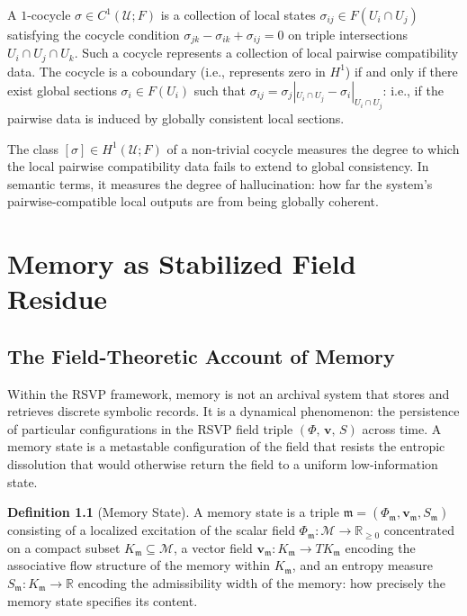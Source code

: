 \documentclass[12pt, a4paper, openany]{book}
\theoremstyle{plain}
\theoremstyle{definition}
\newtheorem{definition}[theorem]{Definition}
\theoremstyle{remark}
\newcommand{\vvec}{\mathbf{v}}
\newcommand{\Sfield}{S}
\newcommand{\RSVPtriple}{(\Phi,\,\vvec,\,\Sfield)}
\begin{document}
A $1$-cocycle $\sigma \in C^1(\mathcal{U}; F)$ is a collection of local states $\sigma_{ij} \in F(U_i \cap U_j)$ satisfying the cocycle condition $\sigma_{jk} - \sigma_{ik} + \sigma_{ij} = 0$ on triple intersections $U_i \cap U_j \cap U_k$. Such a cocycle represents a collection of local pairwise compatibility data. The cocycle is a coboundary (i.e., represents zero in $H^1$) if and only if there exist global sections $\sigma_i \in F(U_i)$ such that $\sigma_{ij} = \sigma_j|_{U_i \cap U_j} - \sigma_i|_{U_i \cap U_j}$: i.e., if the pairwise data is induced by globally consistent local sections.

The class $[\sigma] \in H^1(\mathcal{U}; F)$ of a non-trivial cocycle measures the degree to which the local pairwise compatibility data fails to extend to global consistency. In semantic terms, it measures the degree of hallucination: how far the system's pairwise-compatible local outputs are from being globally coherent.

\chapter{Memory as Stabilized Field Residue}

\section{The Field-Theoretic Account of Memory}

Within the RSVP framework, memory is not an archival system that stores and retrieves discrete symbolic records. It is a dynamical phenomenon: the persistence of particular configurations in the RSVP field triple $\RSVPtriple$ across time. A memory state is a metastable configuration of the field that resists the entropic dissolution that would otherwise return the field to a uniform low-information state.

\begin{definition}[Memory State]
A memory state is a triple $\mathfrak{m} = (\Phi_\mathfrak{m}, \vvec_\mathfrak{m}, \Sfield_\mathfrak{m})$ consisting of a localized excitation of the scalar field $\Phi_\mathfrak{m}: \mathcal{M} \to \mathbb{R}_{\geq 0}$ concentrated on a compact subset $K_\mathfrak{m} \subseteq \mathcal{M}$, a vector field $\vvec_\mathfrak{m}: K_\mathfrak{m} \to TK_\mathfrak{m}$ encoding the associative flow structure of the memory within $K_\mathfrak{m}$, and an entropy measure $\Sfield_\mathfrak{m}: K_\mathfrak{m} \to \mathbb{R}$ encoding the admissibility width of the memory: how precisely the memory state specifies its content.
\end{definition}
\end{document}
